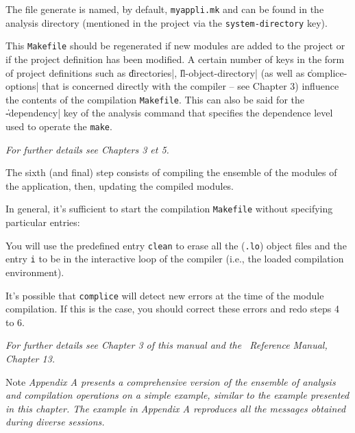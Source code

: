 The file generate is named, by default, {\tt myappli.mk} and can be found in the analysis directory (mentioned in the project via the {\tt system-directory} key).

This {\tt Makefile} should be regenerated if new modules are added to the project or if the project definition has been modified.  A certain number of keys in the form of project definitions such as \|directories|, \|ll-object-directory| (as well as \|complice-options| that is concerned directly with the compiler -- see Chapter 3) influence the contents of the compilation {\tt Makefile}.
This can also be said for the \|-dependency| key of the analysis command that specifies the dependence level used to operate the {\tt make}.

\medskip 

{\em For further details see Chapters 3 et 5.}



The sixth (and final) step consists of compiling the ensemble of the modules of the application, then, updating the compiled modules.

In general, it's sufficient to start the compilation {\tt Makefile} without specifying particular entries:
\begin{Code*}
\end{Code*}

You will use the predefined entry {\tt clean} to erase all the ({\tt .lo}) object files and the entry {\tt i} to be in the interactive loop of the compiler (i.e., the loaded compilation environment).

It's possible that {\tt complice} will detect new errors at the time of the module compilation.  If this is the case, you should correct these errors and redo steps 4 to 6.

{\em For further details see Chapter 3 of this manual and the \LeLisp\  Reference Manual, Chapter 13.}

\bigskip

\begin{Side}{Note}
{\em Appendix A presents a comprehensive version of the ensemble of analysis and compilation operations on a simple example, similar to the example presented in this chapter.  The example in Appendix A reproduces all the messages obtained during diverse sessions.}
\end{Side}


